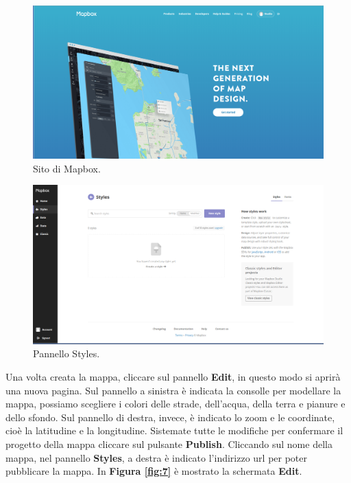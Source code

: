 \documentclass[a4paper,11pt]{article}
\begin{document}
\newpage
\begin{figure}[htpb]
	\centering
	\includegraphics[scale=0.25]{Mapbox.png}
	\caption{Sito di Mapbox.}
	\label{fig:5}
\end{figure}
\begin{figure}[htpb]
	\centering
	\includegraphics[scale=0.26]{Styles.png}
	\caption{Pannello Styles.}
	\label{fig:6}
\end{figure}
Una volta creata la mappa, cliccare sul pannello \textbf{Edit}, in questo modo si aprirà una nuova pagina.
Sul pannello  a sinistra è indicata la consolle per modellare la mappa, possiamo scegliere i colori delle strade, dell'acqua, della terra e pianure e dello sfondo.\newline
Sul pannello di destra, invece, è indicato lo zoom e le coordinate, cioè la latitudine e la longitudine. Sistemate tutte le modifiche per confermare il progetto della mappa cliccare sul pulsante \textbf{Publish}.
Cliccando sul nome della mappa, nel pannello \textbf{Styles}, a destra è indicato l'indirizzo url per poter pubblicare la mappa.
In \textbf{Figura \ref{fig:7}} è mostrato la schermata \textbf{Edit}.
\end{document}
